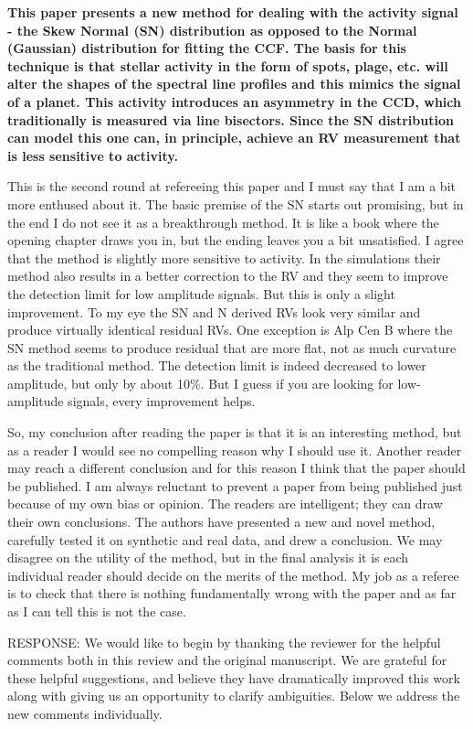 \documentclass[11pt]{article}   	%
\begin{document}
{\bf This paper presents a new method for dealing with the activity signal - the Skew Normal (SN) distribution as opposed to the Normal (Gaussian) distribution for fitting the CCF. The basis for this technique is that stellar activity in the form of spots, plage, etc. will alter the shapes of the spectral line profiles and this mimics the signal of a planet. This activity introduces an asymmetry in the CCD, which traditionally is measured via line bisectors. Since the SN distribution can model this one can, in principle, achieve an RV measurement that is less sensitive to activity.

This is the second round at refereeing this paper and I must say that I am a bit more enthused about it. The basic premise of the SN starts out promising, but in the end I do not see it as a breakthrough method. It is like a book where the opening chapter draws you in, but the ending leaves you a bit unsatisfied.
I agree that the method is slightly more sensitive to activity. In the simulations their method also results in a better correction to the RV and they seem to improve the detection limit for low amplitude signals. But this is only a slight improvement. To my eye the SN and N derived RVs look very similar and produce virtually identical residual RVs. One exception is Alp Cen B where the SN method seems to produce residual that are more flat, not as much curvature as the traditional method. The detection limit is indeed decreased to lower amplitude, but only by about 10\%. But I guess if you are looking for low-amplitude signals, every improvement helps.

So, my conclusion after reading the paper is that it is an interesting method, but as a reader I would see no compelling reason why I should use it. Another reader may reach a different conclusion and for this reason I think that the paper should be published. I am always reluctant to prevent a paper from being published just because of my own bias or opinion. The readers are intelligent; they can draw their own conclusions. The authors have presented a new and novel method, carefully tested it on synthetic and real data, and drew a conclusion. We may disagree on the utility of the method, but in the final analysis it is each individual reader should decide on the merits of the method. My job as a referee is to check that there is nothing fundamentally wrong with the paper and as far as I can tell this is not the case.} 
\bigskip

\noindent RESPONSE:  We would like to begin by thanking the reviewer for the helpful comments both in this review and the original manuscript.  We are grateful for these helpful suggestions, and believe they have dramatically improved this work along with giving us an opportunity to clarify ambiguities.  Below we address the new comments individually.  
\end{document}
